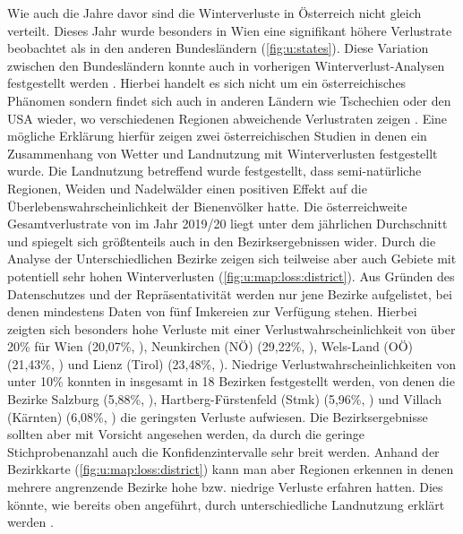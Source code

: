 Wie auch die Jahre davor sind die Winterverluste in Österreich nicht gleich verteilt. Dieses Jahr wurde besonders in Wien eine signifikant höhere Verlustrate beobachtet als in den anderen Bundesländern (\cref{fig:u:states}). Diese Variation zwischen den Bundesländern konnte auch in vorherigen Winterverlust-Analysen festgestellt werden \citep{crailsheim2018, brodschneider2018a, brodschneider2019b, oberreiter2020}. Hierbei handelt es sich nicht um ein österreichisches Phänomen sondern findet sich auch in anderen Ländern wie Tschechien oder den USA wieder, wo verschiedenen Regionen abweichende Verlustraten zeigen \citep{brodschneider2019,vanengelsdorp2008,vanengelsdorp2010}. Eine mögliche Erklärung hierfür zeigen zwei österreichischen Studien in denen ein Zusammenhang von Wetter \citep{switanek2017} und Landnutzung \citep{kuchling2018} mit Winterverlusten festgestellt wurde. Die Landnutzung betreffend wurde festgestellt, dass semi-natürliche Regionen, Weiden und Nadelwälder einen positiven Effekt auf die Überlebenswahrscheinlichkeit der Bienenvölker hatte.
\newline
Die österreichweite Gesamtverlustrate von  im Jahr 2019/20 liegt unter dem jährlichen Durchschnitt und spiegelt sich größtenteils auch in den Bezirksergebnissen wider. 
\newline
Durch die Analyse der Unterschiedlichen Bezirke zeigen sich teilweise aber auch Gebiete mit potentiell sehr hohen Winterverlusten (\cref{fig:u:map:loss:district}). Aus Gründen des Datenschutzes und der Repräsentativität werden nur jene Bezirke aufgelistet, bei denen mindestens Daten von fünf Imkereien zur Verfügung stehen. Hierbei zeigten sich besonders hohe Verluste mit einer Verlustwahrscheinlichkeit von über 20\% für Wien (20,07\%, ), Neunkirchen (NÖ) (29,22\%, ), Wels-Land (OÖ) (21,43\%, ) und Lienz (Tirol) (23,48\%, ). Niedrige Verlustwahrscheinlichkeiten von unter 10\% konnten in insgesamt in 18 Bezirken festgestellt werden, von denen die Bezirke Salzburg (5,88\%, ), Hartberg-Fürstenfeld (Stmk) (5,96\%, ) und Villach (Kärnten) (6,08\%, ) die geringsten Verluste aufwiesen.
\newline
Die Bezirksergebnisse sollten aber mit Vorsicht angesehen werden, da durch die geringe Stichprobenanzahl auch die Konfidenzintervalle sehr breit werden. Anhand der Bezirkkarte (\cref{fig:u:map:loss:district}) kann man aber Regionen erkennen in denen mehrere angrenzende Bezirke hohe bzw. niedrige Verluste erfahren hatten. Dies könnte, wie bereits oben angeführt, durch unterschiedliche Landnutzung erklärt werden \citep{kuchling2018}.

